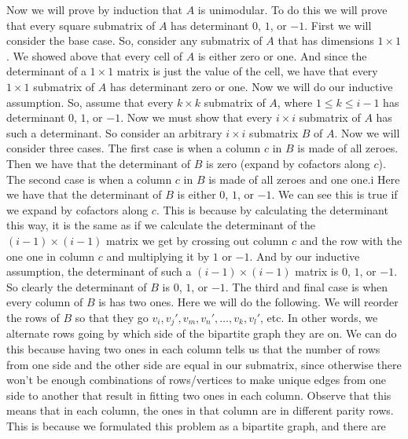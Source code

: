 \documentclass{article}
\begin{document}
\begin{description}
        Now we will prove by induction that $A$ is unimodular. To do this we
        will prove that every square submatrix of $A$ has determinant $0$, $1$,
        or $-1$.
        First we will consider the base case. So, consider any submatrix of $A$
        that has dimensions $1 \times 1$. We showed above that every cell of $A$
        is either zero or one. And since the determinant of a $1 \times 1$
        matrix is just the value of the cell, we have that every $1 \times 1$
        submatrix of $A$ has determinant zero or one. Now we will do our inductive
        assumption. So, assume that every $k \times k$ submatrix of
        $A$, where $1 \le k \le i - 1$ has determinant $0$, $1$, or $-1$.
        Now we must show that every $i \times i$ submatrix of
        $A$ has such a determinant. So consider an arbitrary $i \times i$
        submatrix $B$ of $A$.
        Now we will consider three cases. The first case is when a column $c$ in
        $B$ is made of all
        zeroes. Then we have that the determinant of $B$ is zero (expand by
        cofactors along $c$). The second case is when a
        column $c$ in $B$ is made of
        all zeroes and one one.i Here we have that the determinant of $B$ is either $0$, $1$,
        or $-1$. We can see this is true if we expand by cofactors along $c$.
        This is because by calculating the determinant this way, it is the same
        as if we calculate the determinant of the $(i - 1) \times (i - 1)$
        matrix we get by crossing out column $c$ and the row with the one one in
        column $c$ and multiplying it by $1$ or $-1$. And by our inductive
        assumption, the determinant of such a $(i - 1) \times (i - 1)$ matrix is
        $0$, $1$, or $-1$. So clearly the determinant of $B$ is $0$, $1$, or
        $-1$. The third and final case
        is when every column of $B$ is has two ones. Here we will do the
        following. We will reorder the rows of $B$ so that they go $v_i, v_j',
        v_m, v_n', \dots, v_k, v_l'$, etc. In other words, we alternate rows going by
        which side of the bipartite graph they are on. We can do this because
        having two ones in each column tells us that the number of rows from one
        side and the other side are equal in our submatrix, since otherwise
        there won't be enough combinations of rows/vertices to make unique edges
        from one side to another that result in fitting two ones in each column.
        Observe that this means that in each
        column, the ones in that column are in different parity rows. This is
        because we formulated this problem as a bipartite graph, and there are

\end{description}
\end{document}
